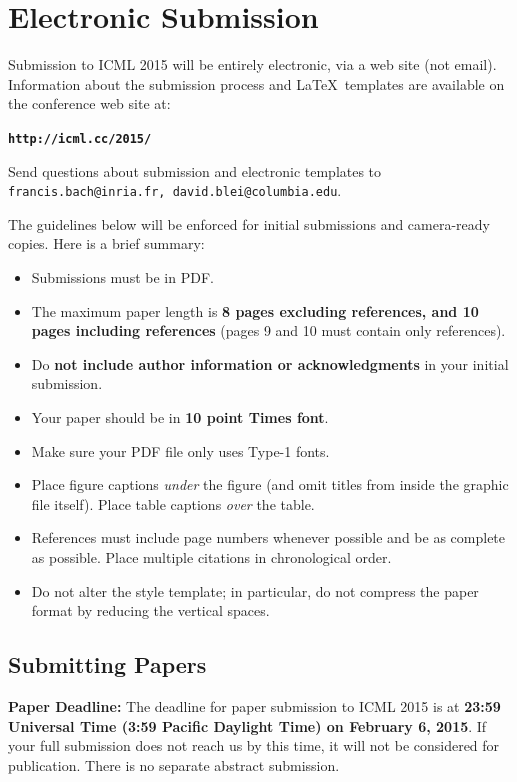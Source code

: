 \documentclass{article}
\begin{document}
\section{Electronic Submission}
\label{submission}

Submission to ICML 2015 will be entirely electronic, via a web site
(not email).  Information about the submission process and \LaTeX\ templates
are available on the conference web site at:
\begin{center}
\textbf{\texttt{http://icml.cc/2015/}}
\end{center}
Send questions about submission and electronic templates to
\texttt{francis.bach@inria.fr, david.blei@columbia.edu}.

The guidelines below will be enforced for initial submissions and
camera-ready copies.  Here is a brief summary:
\begin{itemize}
\item Submissions must be in PDF.
\item The maximum paper length is \textbf{8 pages excluding references, and 10 pages
  including references} (pages 9 and 10 must contain only references).
\item Do \textbf{not include author information or acknowledgments} in your initial
submission. 
\item Your paper should be in \textbf{10 point Times font}.
\item Make sure your PDF file only uses Type-1 fonts.
\item Place figure captions {\em under} the figure (and omit titles from inside
the graphic file itself).  Place table captions {\em over} the table.
\item References must include page numbers whenever possible and be as complete
as possible.  Place multiple citations in chronological order.  
\item Do not alter the style template; in particular, do not compress the paper
format by reducing the vertical spaces.
\end{itemize}

\subsection{Submitting Papers}

{\bf Paper Deadline:} The deadline for paper submission to ICML 2015
is at \textbf{23:59 Universal Time (3:59 Pacific Daylight Time) on February 6, 2015}.
If your full submission does not reach us by this time, it will 
not be considered for publication. There is no separate abstract submission.
\end{document}
